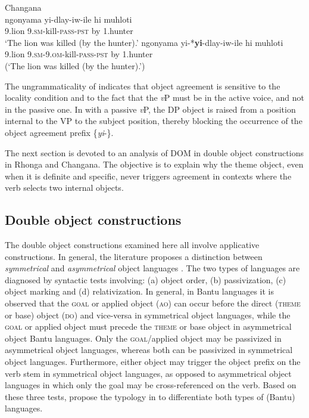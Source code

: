 \documentclass[output=paper]{langsci/langscibook}
\begin{document}
\ea\label{ex:nguna:26}
{Changana}\\
\ea\label{ex:nguna:26a}
\gll ngonyama            yi-dlay-iw-ile               hi      muhloti\\
     9.lion                   9.\textsc{sm}-kill-\textsc{pass}-\textsc{pst}       by     1.hunter\\
\glt ‘The lion was killed (by the hunter).’
\ex\label{ex:nguna:26b}
\gll *ngonyama          yi-*\textbf{yi}-dlay-iw-ile                  hi       muhloti\\
     9.lion                   9.\textsc{sm-9.om}-kill-\textsc{pass-pst}       by      1.hunter\\
\glt (‘The lion was killed (by the hunter).’)
\z
\z

The ungrammaticality of  indicates that object agreement is sensitive to the locality condition and to the fact that the {\textit{v}}P must be in the active voice, and not in the passive one. In  with a passive {\textit{v}}P, the DP object is raised from a position internal to the VP to the subject position, thereby blocking the occurrence of the object agreement prefix \{{\textit{yi}}-\}.

The next section is devoted to an analysis of DOM in double object constructions in Rhonga and Changana. The objective is to explain why the theme object, even when it is definite and specific, never triggers agreement in contexts where the verb selects two internal objects.
 
\subsection{Double object constructions}\label{sec:nguna:4.3}

The double object constructions examined here all involve applicative constructions. {In general, }the literature proposes a distinction between \textit{symmetrical} and \textit{asymmetrical} object languages \citep{BresnanMoshi1990,Chimbutane2002,NgonyaniGithinji2006}. The two types of languages are diagnosed by syntactic tests involving: (a) object order, (b) passivization, (c) object marking and (d) relativization. In general, in Bantu languages it is observed that the \textsc{goal} or applied object (\textsc{ao}) can occur before the direct (\textsc{theme} or base) object (\textsc{do}) and vice-versa in symmetrical object languages, while the \textsc{goal} or applied object must precede the \textsc{theme} or base object in asymmetrical object Bantu languages. Only the \textsc{goal}/applied object may be passivized in asymmetrical object languages, whereas both can be passivized in symmetrical object languages. Furthermore, either object may trigger the object prefix on the verb stem in symmetrical object languages, as opposed to asymmetrical object languages in which only the goal may be cross-referenced on the verb. Based on these three tests, \citet{BresnanMoshi1990} propose the typology in  to differentiate both types of (Bantu) languages.
\end{document}
